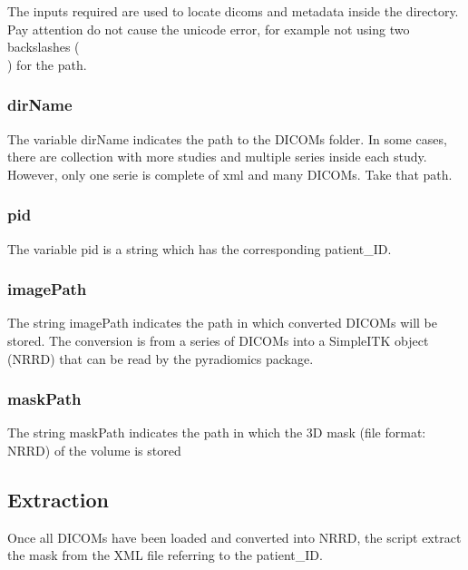 \documentclass[12pt]{article}
\begin{document}
The inputs required are used to locate dicoms and metadata inside the directory. 
Pay attention do not cause the unicode error, for example not using two backslashes (\\) for the path.

	\subsubsection{dirName}
The variable dirName indicates the path to the DICOMs folder. 
In some cases, there are collection with more studies and multiple series inside each study. 
However, only one serie is complete of xml and many DICOMs. 
Take that path.

	\subsubsection{pid}
The variable pid is a string which has the corresponding patient_ID.

	\subsubsection{imagePath}
The string imagePath indicates the path in which converted DICOMs will be stored.
The conversion is from a series of DICOMs into a SimpleITK object (NRRD) that can be read by the pyradiomics \cite{pyradiomics} package.

	\subsubsection{maskPath}
The string maskPath indicates the path in which the 3D mask (file format: NRRD) of the volume is stored

	\subsection{Extraction}
Once all DICOMs have been loaded and converted into NRRD, the script extract the mask from the XML file referring to the patient_ID.
\end{document}
